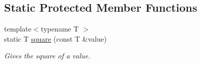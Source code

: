 \subsection*{Static Protected Member Functions}
\begin{DoxyCompactItemize}
\item 
\hypertarget{classofeli_1_1_active_contour_a8a880bf04c5ed62915987145ff05e502}{{\footnotesize template$<$typename T $>$ }\\static T \hyperlink{classofeli_1_1_active_contour_a8a880bf04c5ed62915987145ff05e502}{square} (const T \&value)}\label{classofeli_1_1_active_contour_a8a880bf04c5ed62915987145ff05e502}

\begin{DoxyCompactList}\small\item\em Gives the square of a value. \end{DoxyCompactList}\end{DoxyCompactItemize}
